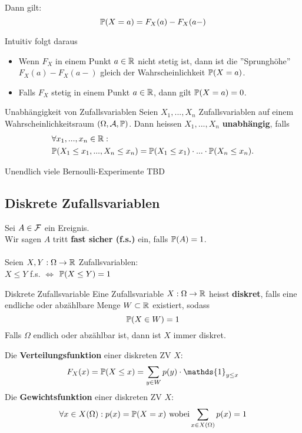 Dann gilt:
$$\P(X = a) = F_X(a) - F_X(a-)$$

Intuitiv folgt daraus
\begin{itemize}
    \item Wenn $F_X$ in einem Punkt $a \in \R$ nicht stetig ist, dann ist die ''Sprunghöhe'' $F_X(a)-F_X(a-)$ gleich der Wahrscheinlichkeit $\P(X = a)$.
    \item Falls $F_X$ stetig in einem Punkt $a \in \R$, dann gilt $\P(X = a) = 0$. 
\end{itemize}

\begin{mainbox}{Unabhängigkeit von Zufallsvariablen}
    Seien $X_1, ...,X_n$ Zufallsvariablen auf einem Wahrscheinlichkeitsraum $(\Omega, \A, \P)$. Dann heissen $X_1, ...,X_n$ \textbf{unabhängig}, falls
    \begin{align*}
        &\forall x_1, ..., x_n \in \R:\\
        &\P(X_1 \leq x_1, ..., X_n \leq x_n) = \P(X_1 \leq x_1)\cdot ... \cdot \P(X_n \leq x_n).
    \end{align*} 
\end{mainbox}

\begin{subbox}{Unendlich viele Bernoulli-Experimente}
    TBD
\end{subbox}

\subsection{Diskrete Zufallsvariablen}
Sei $A \in \F$ ein Ereignis.\\
Wir sagen $A$ tritt \textbf{fast sicher (f.s.)} ein, falls $\P(A)= 1$.
\\ \\
Seien $X, Y: \Omega \to \R$ Zufallsvariablen: \\$X \leq Y$ f.s. $\iff$ $\P(X \leq Y)=1$


\begin{mainbox}{Diskrete Zufallsvariable}
    Eine Zufallsvariable $X: \Omega \to \R$ heisst \textbf{diskret}, falls eine endliche oder abzählbare Menge $W \subset \R$ existiert, sodass
    $$\P(X \in W) = 1$$
    Falls $\Omega$ endlich oder abzählbar ist, dann ist $X$ immer diskret.
\end{mainbox}
Die \textbf{Verteilungsfunktion} einer diskreten ZV $X$: $$F_X(x)= \P(X \leq x)= \sum_{y\in W}p(y)\cdot \mathds{1}_{y\leq x}$$
Die \textbf{Gewichtsfunktion} einer diskreten ZV $X$: $$\forall x \in X(\Omega): p(x)= \P(X=x) \text{ wobei} \sum_{x \in X(\Omega)}p(x)= 1$$

